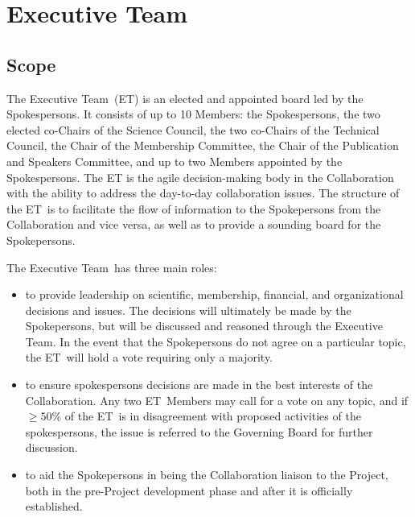 \documentclass[12pt]{article}
\newcommand{\exec}{{Executive Team}}
\newcommand{\shorte}{{ET}}  %
\begin{document}
\section{\exec}
\label{sec:exec}

\subsection{Scope}

The \exec \ (\shorte) is an elected and appointed board led by the Spokespersons. It consists of up to 10 Members: the Spokespersons, the two elected co-Chairs of the Science Council, the two co-Chairs of the Technical Council, the Chair of the Membership Committee, the Chair of the Publication and Speakers Committee, and up to two  Members appointed by the Spokespersons. The ET is the agile decision-making body in the Collaboration with the ability to address the day-to-day collaboration issues.  The structure of the \shorte\ is to facilitate the flow of information to the Spokepersons from the Collaboration and vice versa, as well as to provide a sounding board for the Spokepersons.

The \exec \ has three main roles:
\begin{itemize}

\item to provide leadership on scientific, membership, financial, and organizational decisions and issues. The decisions will ultimately be made by the Spokepersons, but will be discussed and reasoned through the \exec.  In the event that the Spokepersons do not agree on a particular topic, the \shorte\ will hold a vote requiring only a majority.

\item to ensure spokespersons decisions are made in the best interests of the Collaboration.  Any two \shorte\ Members may call for a vote on any topic, and if $\geq 50\%$ of the \shorte\ is in disagreement with proposed activities of the spokespersons, the issue is referred to the Governing Board for further discussion. 

\item to aid the Spokepersons in being the Collaboration liaison to the Project, both in the pre-Project development phase and after it is officially established.

\end{itemize}
\end{document}
